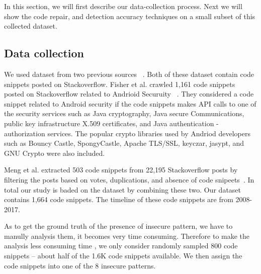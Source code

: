 In this section, we will first describe our data-collection process. Next we will show the code repair, and detection accuracy techniques on a small subset of this collected dataset.   

\subsection{Data collection} 
  We used dataset from two previous sources ~\cite{meng2018secure,fischer2017stack}. Both of these dataset contain code snippets posted on Stackoverflow. 
  Fisher et al. crawled 1,161 code snippets posted on Stackoverflow related to Andrioid Securuity ~\cite{fischer2017stack}. They considered a code snippet related to Android security if the code snippets makes API calls to
  one of the security services such as Java cryptography, Java secure Communications, public key infrastructure X.509 certificates, and Java authentication - authorization services. The popular crypto libraries used by Andriod developers such as Bouncy Castle, SpongyCastle, Apache TLS/SSL, keyczar, jasypt, and GNU Crypto were also included. 
  
  Meng et al.  extracted 503 code snippets from 22,195 Stackoverflow posts by filtering the posts based on votes, duplications, and absence of code snipeets~\cite{meng2018secure}. In total our study is baded on the dataset by combining these two. Our dataset contains 1,664 code snippets. The timeline of these code snippets are from 2008-2017.

  As to get the ground truth of the presence of insecure pattern, we have to manully analysis them, it becomes very time consuming. Therefore to make the analysis less consuming time , we only consider randomly sampled 800 code snippets -- about half of the 1.6K code snippets available. 
  We then assign the code snippets into one of the 8 insecure patterns.  %
  

